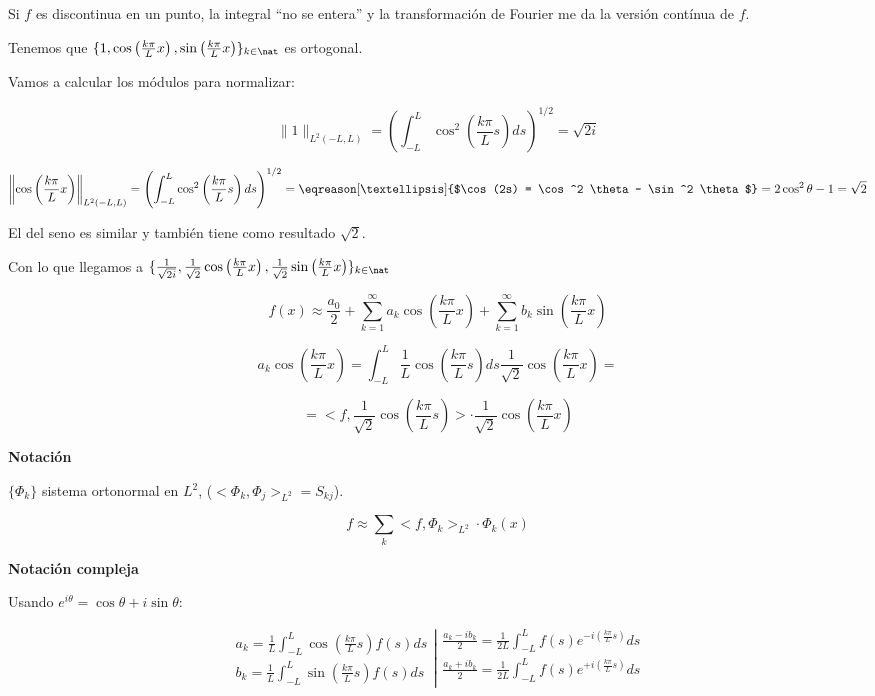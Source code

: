 		\obs Si $f$ es discontinua en un punto, la integral ``no se entera'' y la transformación de Fourier me da la versión contínua de $f$.

		Tenemos que $\{1, \cos \left( \frac{k \pi}{L} x \right), \sin \left( \frac{k \pi}{L} x \right)\}_{k \in \nat}$ es ortogonal.

		Vamos a calcular los módulos para normalizar:

		\[\|1\|_{L^2 (-L,L)} = \left( \int_{-L}^L \cos^2  \left( \frac{k \pi}{L} s \right) ds \right)^{1/2} = \sqrt{2i} \]

		\[\left\|\cos \left( \frac{k \pi}{L} x \right)\right\|_{L^2 (-L,L)} = \left( \int_{-L}^L \cos^2  \left( \frac{k \pi}{L} s \right) ds \right)^{1/2} = \eqreason[…]{$\cos(2s) = \cos^2 \theta - \sin^2 \theta$} = 2 \cos^2 \theta - 1 = \sqrt{2} \]

		El del seno es similar y también tiene como resultado $\sqrt{2}$.

		Con lo que llegamos a $\{\frac{1}{\sqrt{2i}}, \frac{1}{\sqrt{2}} \cos \left( \frac{k \pi}{L} x \right),\frac{1}{\sqrt{2}} \sin \left( \frac{k \pi}{L} x \right)\}_{k \in \nat}$


		\[ f(x) ≈ \frac{a_0}{2} + \sum_{k=1}^\infty a_k \cos \left( \frac{k \pi}{L} x \right) + \sum_{k=1}^\infty b_k \sin \left( \frac{k \pi}{L} x \right) \]

		\[ a_k \cos \left( \frac{k \pi}{L} x \right) = \int^L_{-L} \frac{1}{L} \cos \left( \frac{k \pi}{L} s \right) ds \frac{1}{\sqrt{2}} \cos \left( \frac{k \pi}{L} x \right) = \]

		\[ = < f, \frac{1}{\sqrt{2}} \cos \left( \frac{k \pi}{L} s \right)> \cdot \frac{1}{\sqrt{2}} \cos \left( \frac{k \pi}{L} x \right) \]


		\textbf{Notación}

		$\{ \Phi_k \} $ sistema ortonormal en $L^2$, ($<\Phi_k,\Phi_j>_{L^2} = S_{kj}$).

		\[ f ≈ \sum_k < f, \Phi_k >_{L^2} \cdot \Phi_k (x) \]

		\textbf{Notación compleja}

		Usando $e^{i\theta} = \cos \theta + i \sin \theta$:

		\[
		\left. \begin{array}{r}
			a_k = \frac{1}{L} \int^{L}_{-L} \cos \left( \frac{k \pi}{L} s \right) f(s) ds\\
			b_k = \frac{1}{L} \int^{L}_{-L} \sin \left( \frac{k \pi}{L} s \right) f(s) ds
		\end{array} \right| \begin{array}{l}
			\frac{a_k - ib_k}{2} = \frac{1}{2L} \int_{-L}^L f(s) e^{-i \left( \frac{k \pi}{L} s \right)} ds \\
			\frac{a_k + ib_k}{2} = \frac{1}{2L} \int_{-L}^L f(s) e^{+i \left( \frac{k \pi}{L} s \right)} ds \\
		\end{array}
		\]

